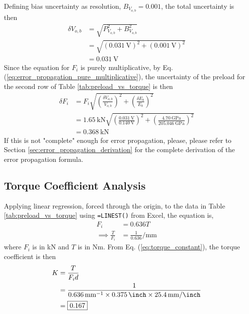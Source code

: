 Defining bias uncertainty as resolution, $B_{V_{o, b}} = 0.001$, the total uncertainty is then
\begin{align*}
    \delta V_{o, b} &= \sqrt{P_{V_{o, b}}^2 + B_{V_{o, b}}^2} \\
    &= \sqrt{(\qty{0.031}{\volt})^2 + (\qty{0.001}{\volt})^2} \\
    &= \qty{0.031}{\volt}
\end{align*}
Since the equation for $F_i$ is purely multiplicative, by Eq. (\ref{eq:error_propagation_pure_multiplicative}), the uncertainty of the preload for the second row of Table \ref{tab:preload_vs_torque} is then \cite{wheeler_ganji}
\begin{align*}
    \delta F_i &= F_i \sqrt{\left(\frac{\delta V_{o, b}}{V_{o, b}}\right)^2 + \left(\frac{\delta E_b}{E_b}\right)^2} \\
    &= \qty{1.65}{\kilo\newton} \sqrt{\left(\frac{\qty{0.031}{\volt}}{\qty{0.140}{\volt}}\right)^2 + \left(\frac{\qty{4.70}{\giga\pascal}}{\qty{205.046}{\giga\pascal}}\right)^2} \\
    &= \boxed{\qty{0.368}{\kilo\newton}}
\end{align*}
If this is not "complete" enough for error propagation, please, please refer to Section \ref{sec:error_propagation_derivation} for the complete derivation of the error propagation formula.

\subsection{Torque Coefficient Analysis}
Applying linear regression, forced through the origin, to the data in Table \ref{tab:preload_vs_torque} using \texttt{=LINEST()} from Excel, the equation is,
\begin{align*}
    F_i &= 0.636 T \\
    \implies \frac{T}{F_i} &= \frac{1}{0.636} \unit{\per\milli\meter}
\end{align*}
where $F_i$ is in kN and $T$ is in Nm. From Eq. (\ref{eq:torque_constant}), the torque coefficient is then
\begin{align*}
    K &= \frac{T}{F_i d} \\
    &= \frac{1}{\qty{0.636}{\per\milli\meter} \times \qty{0.375}{\inch} \times \qty{25.4}{\milli\meter\per\inch}} \\
    &= \boxed{\qty{0.167}{}}
\end{align*}


